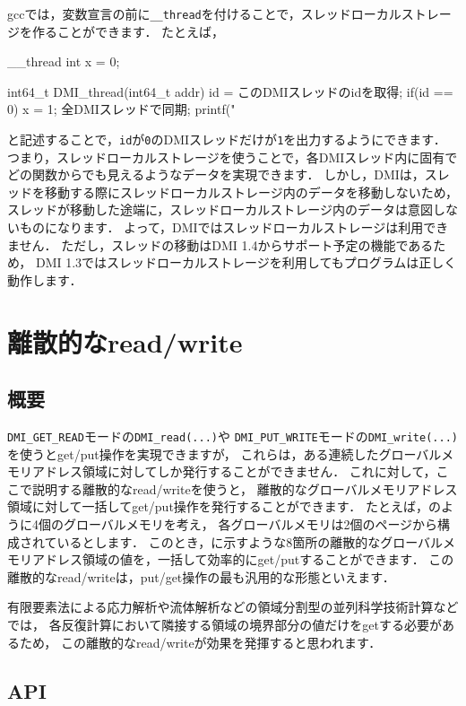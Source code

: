 \documentclass[report,12pt]{jsbook}
\begin{document}
gccでは，変数宣言の前に\texttt{\_\_thread}を付けることで，スレッドローカルストレージを作ることができます．
たとえば，
\begin{code}
__thread int x = 0;

int64_t DMI_thread(int64_t addr)
{
  id = このDMIスレッドのidを取得;
  if(id == 0)
    {
      x = 1;
    }
  全DMIスレッドで同期;
  printf("%
}
\end{code}
と記述することで，\texttt{id}が\texttt{0}のDMIスレッドだけが\texttt{1}を出力するようにできます．
つまり，スレッドローカルストレージを使うことで，各DMIスレッド内に固有でどの関数からでも見えるようなデータを実現できます．
しかし，DMIは，スレッドを移動する際にスレッドローカルストレージ内のデータを移動しないため，
スレッドが移動した途端に，スレッドローカルストレージ内のデータは意図しないものになります．
よって，DMIではスレッドローカルストレージは利用できません．
ただし，スレッドの移動はDMI 1.4からサポート予定の機能であるため，
DMI 1.3ではスレッドローカルストレージを利用してもプログラムは正しく動作します．


\section{離散的なread/write}

\subsection{概要}

\texttt{DMI\_GET\_READ}モードの\texttt{DMI\_read(...)}や
\texttt{DMI\_PUT\_WRITE}モードの\texttt{DMI\_write(...)}を使うとget/put操作を実現できますが，
これらは，ある連続したグローバルメモリアドレス領域に対してしか発行することができません．
これに対して，ここで説明する離散的なread/writeを使うと，
離散的なグローバルメモリアドレス領域に対して一括してget/put操作を発行することができます．
たとえば，のように4個のグローバルメモリを考え，
各グローバルメモリは2個のページから構成されているとします．
このとき，に示すような8箇所の離散的なグローバルメモリアドレス領域の値を，一括して効率的にget/putすることができます．
この離散的なread/writeは，put/get操作の最も汎用的な形態といえます．

有限要素法による応力解析や流体解析などの領域分割型の並列科学技術計算などでは，
各反復計算において隣接する領域の境界部分の値だけをgetする必要があるため，
この離散的なread/writeが効果を発揮すると思われます．

\subsection{API}
\end{document}
